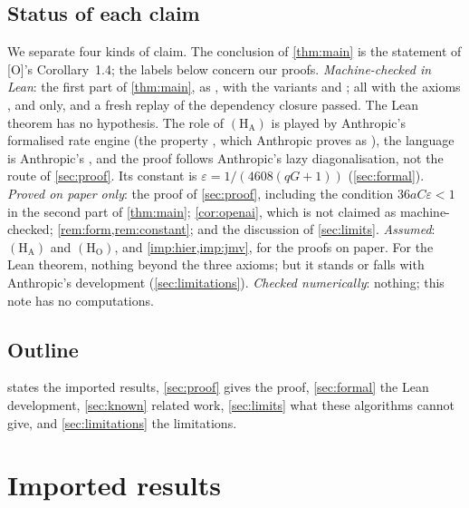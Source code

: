 \documentclass[10pt]{amsart}
\theoremstyle{plain}
\theoremstyle{definition}
\theoremstyle{remark}
\numberwithin{equation}{section}
\newcommand{\Oa}{\textup{[O]}}
\begin{document}
\subsection{Status of each claim}\label{sec:status}
We separate four kinds of claim. The conclusion of \cref{thm:main} is the statement of \Oa's
Corollary~1.4; the labels below concern our proofs. \emph{Machine-checked in Lean}: the first part of \cref{thm:main}, as
, with the variants
 and ; all with the
axioms ,  and  only, and a fresh
 replay of the dependency closure passed. The Lean theorem has no hypothesis. The
role of $(\mathrm{H}_{\mathrm{A}})$ is played by Anthropic's formalised rate engine (the property
, which Anthropic proves as ), the language is Anthropic's , and the proof follows
Anthropic's lazy diagonalisation, not the route of \cref{sec:proof}. Its constant is
$\varepsilon=1/(4608(qG+1))$ (\cref{sec:formal}).
\emph{Proved on paper only}: the proof of \cref{sec:proof}, including the condition
$36aC\varepsilon<1$ in the second part of \cref{thm:main}; \cref{cor:openai}, which is not claimed as
machine-checked; \cref{rem:form,rem:constant}; and the discussion of \cref{sec:limits}.
\emph{Assumed}: $(\mathrm{H}_{\mathrm{A}})$ and $(\mathrm{H}_{\mathrm{O}})$, and
\cref{imp:hier,imp:jmv}, for the proofs on paper. For the Lean theorem, nothing beyond the three
axioms; but it stands or falls with Anthropic's development (\cref{sec:limitations}).
\emph{Checked numerically}: nothing; this note has no computations.

\subsection*{Outline}
 states the imported results, \cref{sec:proof} gives the proof,
\cref{sec:formal} the Lean development, \cref{sec:known} related work, \cref{sec:limits} what these
algorithms cannot give, and \cref{sec:limitations} the limitations.

\section{Imported results}\label{sec:imported}
\end{document}
